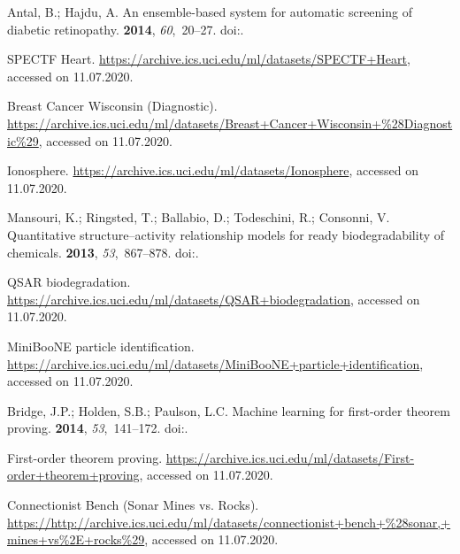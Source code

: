 \documentclass[entropy,article,submit,moreauthors,pdftex]{Definitions/mdpi}
\begin{document}
\begin{thebibliography}{-------}
Antal, B.; Hajdu, A.
\newblock An ensemble-based system for automatic screening of diabetic
  retinopathy.
 {\bf 2014}, {\em 60},~20--27.
\newblock
  doi:{\href{https://doi.org/10.1016/j.knosys.2013.12.023}{}}.

SPECTF Heart.
\newblock \url{https://archive.ics.uci.edu/ml/datasets/SPECTF+Heart}, accessed
  on 11.07.2020.

Breast Cancer Wisconsin (Diagnostic).
\newblock
  \url{https://archive.ics.uci.edu/ml/datasets/Breast+Cancer+Wisconsin+%28Diagnostic%29},
  accessed on 11.07.2020.

Ionosphere.
\newblock \url{https://archive.ics.uci.edu/ml/datasets/Ionosphere}, accessed on
  11.07.2020.

Mansouri, K.; Ringsted, T.; Ballabio, D.; Todeschini, R.; Consonni, V.
\newblock Quantitative structure--activity relationship models for ready
  biodegradability of chemicals.
 {\bf 2013}, {\em 53},~867--878.
\newblock
  doi:{\href{https://doi.org/10.1021/ci4000213}{}}.

{QSAR} biodegradation.
\newblock \url{https://archive.ics.uci.edu/ml/datasets/QSAR+biodegradation},
  accessed on 11.07.2020.

MiniBooNE particle identification.
\newblock
  \url{https://archive.ics.uci.edu/ml/datasets/MiniBooNE+particle+identification},
  accessed on 11.07.2020.

Bridge, J.P.; Holden, S.B.; Paulson, L.C.
\newblock Machine learning for first-order theorem proving.
 {\bf 2014}, {\em 53},~141--172.
\newblock
  doi:{\href{https://doi.org/10.1007/s10817-014-9301-5}{}}.

First-order theorem proving.
\newblock
  \url{https://archive.ics.uci.edu/ml/datasets/First-order+theorem+proving},
  accessed on 11.07.2020.

Connectionist Bench (Sonar Mines vs. Rocks).
\newblock
  \url{https://http://archive.ics.uci.edu/ml/datasets/connectionist+bench+%28sonar,+mines+vs%2E+rocks%29},
  accessed on 11.07.2020.


\end{thebibliography}
\end{document}
